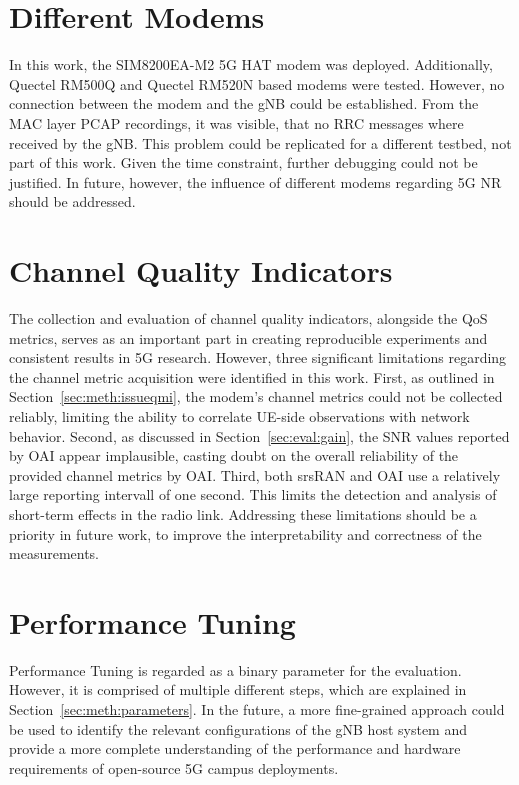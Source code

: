 \section{Different Modems}\label{sec:future:modem}

In this work, the SIM8200EA-M2 5G HAT modem was deployed.
Additionally, Quectel RM500Q and Quectel RM520N based modems were tested.
However, no connection between the modem and the \gls{gNB} could be established.
From the MAC layer PCAP recordings, it was visible, that no \gls{RRC} messages where received by the \gls{gNB}.
This problem could be replicated for a different testbed, not part of this work.
Given the time constraint, further debugging could not be justified.
In future, however, the influence of different modems regarding 5G \gls{NR} should be addressed.


\section{Channel Quality Indicators}\label{sec:future:channelquality}
The collection and evaluation of channel quality indicators, alongside the \gls{QoS} metrics, serves as an important
part in creating reproducible experiments and consistent results in 5G research.
However, three significant limitations regarding the channel metric acquisition were identified in this work.
First, as outlined in Section~\ref{sec:meth:issueqmi}, the modem's channel metrics could not be collected reliably,
limiting the ability to correlate \gls{UE}-side observations with network behavior.
Second, as discussed in Section~\ref{sec:eval:gain}, the \gls{SNR} values reported by OAI appear implausible,
casting doubt on the overall reliability of the provided channel metrics by \gls{OAI}.
Third, both srsRAN and \gls{OAI} use a relatively large reporting intervall of one second.
This limits the detection and analysis of short-term effects in the radio link.
Addressing these limitations should be a priority in future work, to improve the interpretability and correctness of the measurements.


\section{Performance Tuning}\label{sec:future:perfromance}
Performance Tuning is regarded as a binary parameter for the evaluation.
However, it is comprised of multiple different steps, which are explained in Section~\ref{sec:meth:parameters}.
In the future, a more fine-grained approach could be used to identify the relevant configurations of the
\gls{gNB} host system and provide a more complete understanding of the performance and hardware requirements of
open-source 5G campus deployments.



